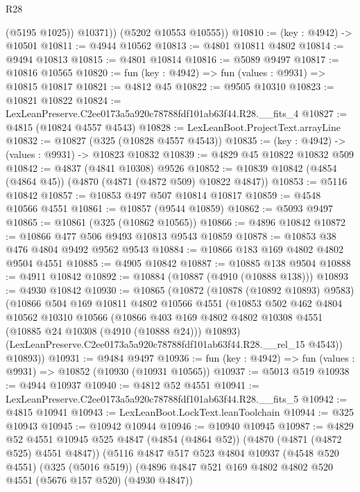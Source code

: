 \begin{lexlean}{R28}
\begin{coremodule}
            (@5195 @1025))
          @10371))
      (@5202 @10553 @10555))
@10810 := (key : @4942) -> @10501
@10811 := @4944 @10562
@10813 := @4801 @10811 @4802
@10814 := @9494 @10813
@10815 := @4801 @10814
@10816 := @5089 @9497
@10817 := @10816 @10565
@10820 := fun (key : @4942) => fun (values : @9931) => @10815 @10817
@10821 := @4812 @45
@10822 := @9505 @10310
@10823 := @10821 @10822
@10824 := LexLeanPreserve.C2ee0173a5a920c78788fdf101ab63f44.R28.__fits_4
@10827 := @4815 (@10824 @4557 @4543)
@10828 := LexLeanBoot.ProjectText.arrayLine
@10832 := @10827 (@325 (@10828 @4557 @4543))
@10835 := (key : @4942) -> (values : @9931) -> @10823 @10832
@10839 := @4829 @45 @10822 @10832 @509
@10842 := @4837 (@4841 @10308) @9526
@10852 := @10839 @10842 (@4854 (@4864 @45)) (@4870 (@4871 (@4872 @509) @10822 @4847))
@10853 := @5116 @10842
@10857 := @10853 @497 @507 @10814 @10817
@10859 := @4548 @10566 @4551
@10861 := @10857 (@9544 @10859)
@10862 := @5093 @9497
@10865 := @10861 (@325 (@10862 @10565))
@10866 := @4896 @10842
@10872 := @10866 @477 @506 @9493 @10813 @9543 @10859
@10878 := @10853 @38 @476 @4804 @9492 @9562 @9543
@10884 := @10866 @183 @169 @4802 @4802 @9504 @4551
@10885 := @4905 @10842
@10887 := @10885 @138 @9504
@10888 := @4911 @10842
@10892 := @10884 (@10887 (@4910 (@10888 @138)))
@10893 := @4930 @10842
@10930 := @10865
    (@10872
      (@10878 (@10892 @10893) @9583)
      (@10866
        @504
        @169
        @10811
        @4802
        @10566
        @4551
        (@10853
          @502
          @462
          @4804
          @10562
          @10310
          @10566
          (@10866
            @403
            @169
            @4802
            @4802
            @10308
            @4551
            (@10885 @24 @10308 (@4910 (@10888 @24)))
            @10893)
          (LexLeanPreserve.C2ee0173a5a920c78788fdf101ab63f44.R28.__rel_15 @4543))
        @10893))
@10931 := @9484 @9497
@10936 := fun (key : @4942) => fun (values : @9931) => @10852 (@10930 (@10931 @10565))
@10937 := @5013 @519
@10938 := @4944 @10937
@10940 := @4812 @52 @4551
@10941 := LexLeanPreserve.C2ee0173a5a920c78788fdf101ab63f44.R28.__fits_5
@10942 := @4815 @10941
@10943 := LexLeanBoot.LockText.leanToolchain
@10944 := @325 @10943
@10945 := @10942 @10944
@10946 := @10940 @10945
@10987 := @4829
    @52
    @4551
    @10945
    @525
    @4847
    (@4854 (@4864 @52))
    (@4870 (@4871 (@4872 @525) @4551 @4847))
    (@5116
      @4847
      @517
      @523
      @4804
      @10937
      (@4548 @520 @4551)
      (@325 (@5016 @519))
      (@4896 @4847 @521 @169 @4802 @4802 @520 @4551 (@5676 @157 @520) (@4930 @4847))

\end{coremodule}
\end{lexlean}
